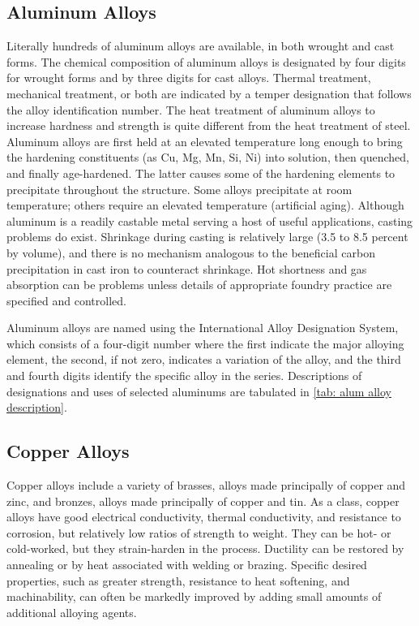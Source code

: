 \documentclass[
10pt,
a4paper,
openany,
svgnames,
]{book}
\begin{document}
\subsection{Aluminum Alloys}

Literally hundreds of aluminum alloys are available, in both wrought and cast forms. The chemical composition of aluminum alloys is designated by four digits for wrought forms and by three digits for cast alloys. Thermal treatment, mechanical treatment, or both are indicated by a temper designation that follows the alloy identification number. The heat treatment of aluminum alloys to increase hardness and strength is quite different from the heat treatment of steel. Aluminum alloys are first held at an elevated temperature long enough to bring the hardening constituents (as Cu, Mg, Mn, Si, Ni) into solution, then quenched, and finally age-hardened. The latter causes some of the hardening elements to precipitate throughout the structure. Some alloys precipitate at room temperature; others require an elevated temperature (artificial aging). Although aluminum is a readily castable metal serving a host of useful applications, casting problems do exist. Shrinkage during casting is relatively large (3.5 to 8.5 percent by volume), and there is no mechanism analogous to the beneficial carbon precipitation in cast iron to counteract shrinkage. Hot shortness and gas absorption can be problems unless details of appropriate foundry practice are specified and controlled.

Aluminum alloys are named using the International Alloy Designation System, which consists of a four-digit number where the first indicate the major alloying element, the second, if not zero, indicates a variation of the alloy, and the third and fourth digits identify the specific alloy in the series. Descriptions of designations and uses of selected aluminums are tabulated in \cref{tab: alum alloy description}.

\subsection{Copper Alloys}

Copper alloys include a variety of brasses, alloys made principally of copper and zinc, and bronzes, alloys made principally of copper and tin. As a class, copper alloys have good electrical conductivity, thermal conductivity, and resistance to corrosion, but relatively low ratios of strength to weight. They can be hot- or cold-worked, but they strain-harden in the process. Ductility can be restored by annealing or by heat associated with welding or brazing. Specific desired properties, such as greater strength, resistance to heat softening, and machinability, can often be markedly improved by adding small amounts of additional alloying agents.
\end{document}

